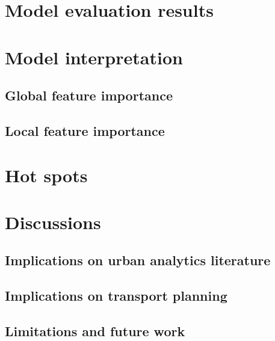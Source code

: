 \pagebreak
\section{Model evaluation results}
\section{Model interpretation}
\subsection{Global feature importance}
\subsection{Local feature importance}

\section{Hot spots}

\section{Discussions}

\subsection{Implications on urban analytics literature}

\subsection{Implications on transport planning}

\subsection{Limitations and future work}